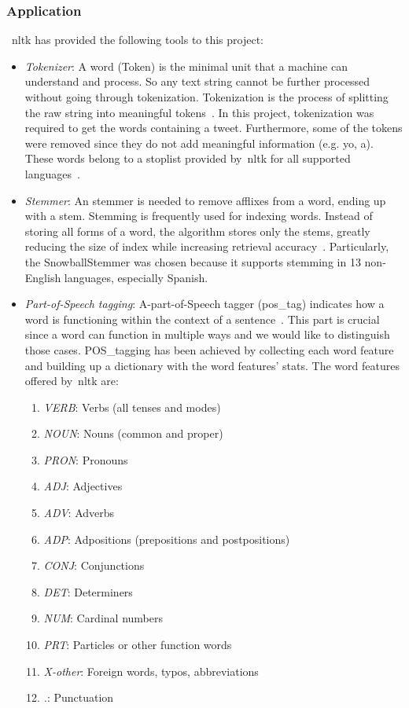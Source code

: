 \subsubsection{Application}
~\ac{nltk} has provided the following tools to this project:
\begin{itemize}
	
	\item \textit{Tokenizer}: A word (Token) is the minimal unit that a machine can understand and process. So any text string cannot be further processed without going through tokenization. Tokenization is the process of splitting the raw string into meaningful tokens~\cite{nltk}. In this project, tokenization was required to get the words containing a tweet. Furthermore, some of the tokens were removed since they do not add meaningful information (e.g. yo, a). These words belong to a stoplist provided by~\ac{nltk} for all supported languages~\cite{nltk}.
	\item \textit{Stemmer}: An stemmer is needed to remove afflixes from a word, ending up with a stem. Stemming is frequently used for indexing words. Instead of storing all forms of a word, the algorithm stores only the stems, greatly reducing the size of index while increasing retrieval accuracy~\cite{nltk}. Particularly, the SnowballStemmer was chosen because it supports stemming in 13 non-English languages, especially Spanish.
	\item \textit{Part-of-Speech tagging}:  A-part-of-Speech tagger (pos\_tag) indicates how a word is functioning within the context of a sentence~\cite{pos}. This part is crucial since a word can function in multiple ways and we would like to distinguish those cases. POS\_tagging has been achieved by collecting each word feature and building up a dictionary with the word features' stats. The word features offered by~\ac{nltk} are:
	\begin{enumerate}
		\item \textit{VERB}: Verbs (all tenses and modes)
		\item \textit{NOUN}: Nouns (common and proper)
		\item \textit{PRON}: Pronouns
		\item \textit{ADJ}: Adjectives
		\item \textit{ADV}: Adverbs
		\item \textit{ADP}: Adpositions (prepositions and postpositions)
		\item \textit{CONJ}: Conjunctions
		\item \textit{DET}: Determiners
		\item \textit{NUM}: Cardinal numbers
		\item \textit{PRT}: Particles or other function words
		\item \textit{X-other}: Foreign words, typos, abbreviations
		\item \textit{.}: Punctuation
	\end{enumerate}
\end{itemize}

